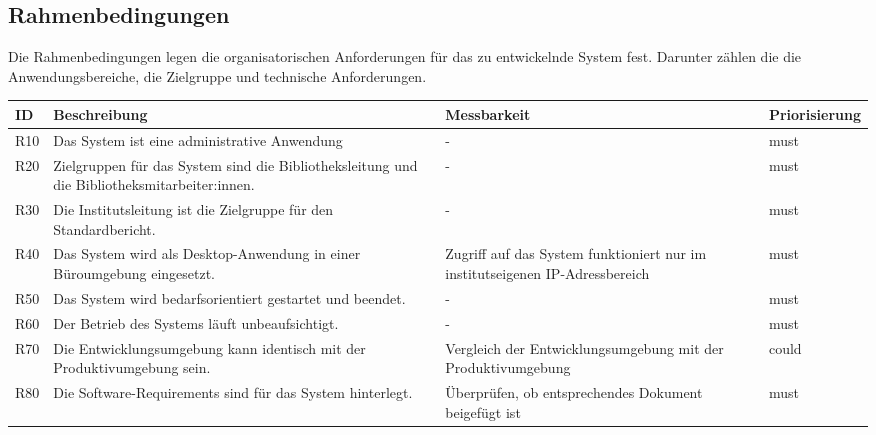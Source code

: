 \subsection{Rahmenbedingungen}
Die Rahmenbedingungen legen die organisatorischen Anforderungen für das zu entwickelnde System fest. 
Darunter zählen die die Anwendungsbereiche, die Zielgruppe und technische Anforderungen. 
\begingroup
\setlength{\tabcolsep}{10pt} %
\renewcommand{\arraystretch}{1.25} 
\begin{table}[h]
    \centering
    \begin{adjustbox}{max width=\textwidth}
    \begin{tabular}{lp{6.5cm}p{6.5cm}l}
       \toprule
       \textbf{ID}          & \textbf{Beschreibung} & \textbf{Messbarkeit} & \textbf{Priorisierung}\\
       \midrule
        R10                               &Das System ist eine administrative Anwendung & -  & must\\
        R20                               &Zielgruppen für das System sind die Bibliotheksleitung und die Bibliotheksmitarbeiter:innen. & -  & must\\
        R30                               &Die Institutsleitung ist die Zielgruppe für den Standardbericht. & -  & must\\
        R40                               &Das System wird als Desktop-Anwendung in einer Büroumgebung eingesetzt. & Zugriff auf das System funktioniert nur im institutseigenen IP-Adressbereich & must\\
        R50                               &Das System wird bedarfsorientiert gestartet und beendet. & -  & must\\
        R60                               &Der Betrieb des Systems läuft unbeaufsichtigt. & -  & must\\
        R70                               &Die Entwicklungsumgebung kann identisch mit der Produktivumgebung sein. & Vergleich der Entwicklungsumgebung mit der Produktivumgebung  & could\\
        R80                               &Die Software-Requirements sind für das System hinterlegt. & Überprüfen, ob entsprechendes Dokument beigefügt ist  & must\\

\end{tabular}
\end{adjustbox}
\end{table}
